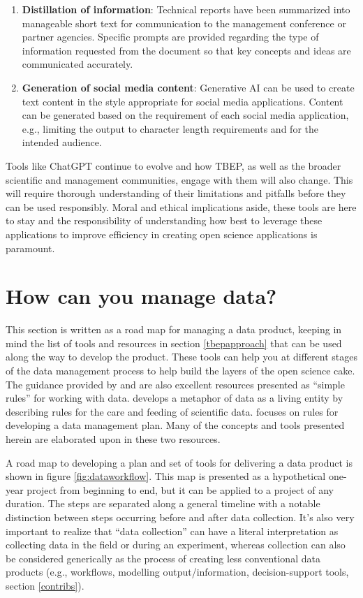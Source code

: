 \documentclass[
]{book}
\providecommand{\tightlist}{%
  \setlength{\itemsep}{0pt}\setlength{\parskip}{0pt}}
\begin{document}
\begin{enumerate}
\def\labelenumi{\arabic{enumi}.}
\tightlist
\item
  \textbf{Distillation of information}: Technical reports have been summarized into manageable short text for communication to the management conference or partner agencies. Specific prompts are provided regarding the type of information requested from the document so that key concepts and ideas are communicated accurately.
\item
  \textbf{Generation of social media content}: Generative AI can be used to create text content in the style appropriate for social media applications. Content can be generated based on the requirement of each social media application, e.g., limiting the output to character length requirements and for the intended audience.
\end{enumerate}

Tools like ChatGPT continue to evolve and how TBEP, as well as the broader scientific and management communities, engage with them will also change. This will require thorough understanding of their limitations and pitfalls before they can be used responsibly. Moral and ethical implications aside, these tools are here to stay and the responsibility of understanding how best to leverage these applications to improve efficiency in creating open science applications is paramount.

\hypertarget{howyou}{%
\section{How can you manage data?}\label{howyou}}

This section is written as a road map for managing a data product, keeping in mind the list of tools and resources in section \ref{tbepapproach} that can be used along the way to develop the product. These tools can help you at different stages of the data management process to help build the layers of the open science cake. The guidance provided by \citet{Goodman14} and \citet{Michener15} are also excellent resources presented as ``simple rules'' for working with data. \citet{Goodman14} develops a metaphor of data as a living entity by describing rules for the care and feeding of scientific data. \citet{Michener15} focuses on rules for developing a data management plan. Many of the concepts and tools presented herein are elaborated upon in these two resources.

A road map to developing a plan and set of tools for delivering a data product is shown in figure \ref{fig:dataworkflow}. This map is presented as a hypothetical one-year project from beginning to end, but it can be applied to a project of any duration. The steps are separated along a general timeline with a notable distinction between steps occurring before and after data collection. It's also very important to realize that ``data collection'' can have a literal interpretation as collecting data in the field or during an experiment, whereas collection can also be considered generically as the process of creating less conventional data products (e.g., workflows, modelling output/information, decision-support tools, section \ref{contribs}).
\end{document}
